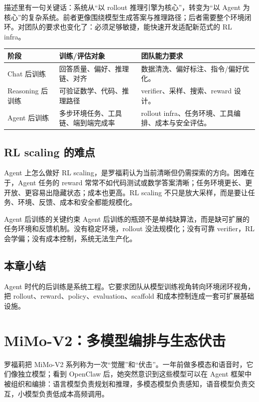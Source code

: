 \documentclass[a4paper]{article}
\begin{document}
描述里有一句关键话：系统从“以 rollout 推理引擎为核心”，转变为“以 Agent 为核心”的复杂系统。前者更像围绕模型生成答案与推理路径；后者需要整个环境闭环。对团队的要求也变化了：必须足够敏捷，能快速开发适配新范式的 RL infra。

\noindent\begin{tabularx}{\textwidth}{p{}p{}X}
\toprule
阶段 & 训练/评估对象 & 团队能力要求 \\
\midrule
Chat 后训练 & 回答质量、偏好、推理链、对齐 & 数据清洗、偏好标注、指令/偏好优化。 \\
Reasoning 后训练 & 可验证数学、代码、推理路径 & verifier、采样、搜索、reward 设计。 \\
Agent 后训练 & 多步环境任务、工具链、端到端完成率 & rollout infra、任务环境、工具编排、成本与安全评估。 \\
\bottomrule
\end{tabularx}

\subsection{RL scaling 的难点}

Agent 上怎么做好 RL scaling，是罗福莉认为当前清晰但仍需探索的方向。困难在于，Agent 任务的 reward 常常不如代码测试或数学答案清晰；任务环境更长、更开放、更容易出隐藏状态；成本也更高。RL scaling 不只是放大采样，而是要让任务、环境、反馈、成本和安全都能规模化。

\begin{importantbox}{Agent 后训练的关键约束}
Agent 后训练的瓶颈不是单纯缺算法，而是缺可扩展的任务环境和反馈机制。没有稳定环境，rollout 没法规模化；没有可靠 verifier，RL 会学偏；没有成本控制，系统无法生产化。
\end{importantbox}

\subsection{本章小结}

Agent 时代的后训练是系统工程。它要求团队从模型训练视角转向环境闭环视角，把 rollout、reward、policy、evaluation、scaffold 和成本控制连成一套可扩展基础设施。

\section{MiMo-V2：多模型编排与生态伏击}

罗福莉把 MiMo-V2 系列称为一次“觉醒”和“伏击”。一年前做多模态和语音时，它们像独立模型；看到 OpenClaw 后，她突然意识到这些模型可以在 Agent 框架中被组织和编排：语言模型负责规划和推理，多模态模型负责感知，语音模型负责交互，小模型负责低成本高频调用。
\end{document}
